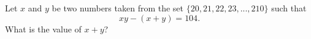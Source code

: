 Let $x$ and $y$ be two numbers taken from the set $\{20, 21, 22, 23, ..., 210\}$ such that \[xy - (x + y) = 104.\]What is the value of $x + y$?

